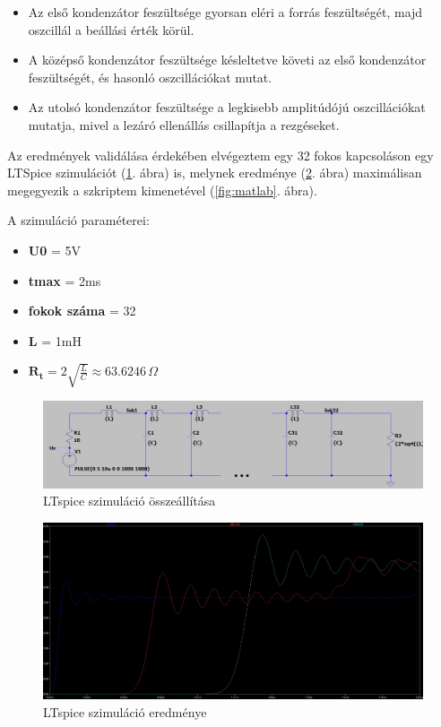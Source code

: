 \documentclass[12pt,a4paper]{article}
\begin{document}
\begin{itemize}
    \item Az első kondenzátor feszültsége gyorsan eléri a forrás feszültségét, majd oszcillál a beállási érték körül.
    \item A középső kondenzátor feszültsége késleltetve követi az első kondenzátor feszültségét, és hasonló oszcillációkat mutat.
    \item Az utolsó kondenzátor feszültsége a legkisebb amplitúdójú oszcillációkat mutatja, mivel a lezáró ellenállás csillapítja a rezgéseket.
\end{itemize}

Az eredmények validálása érdekében elvégeztem egy 32 fokos kapcsoláson egy LTSpice szimulációt (\ref{fig:ltspicesim}. ábra) is, melynek eredménye (\ref{fig:ltspice}. ábra) maximálisan megegyezik a szkriptem kimenetével (\ref{fig:matlab}. ábra).

A szimuláció paraméterei:
\begin{itemize}
    \item \textbf{U0} = 5V
    \item \textbf{tmax} = 2ms
    \item \textbf{fokok száma} = 32
    \item \textbf{L} = 1mH
    \item \( \mathbf{R_t} = 2 \sqrt{\frac{L}{C}} \approx 63.6246 \, \Omega \)
\end{itemize}

\begin{figure}[H]
    \centering
    \includegraphics[width=1\textwidth]{figures/ltspicesim.jpg}
    \caption{LTspice szimuláció összeállítása}
    \label{fig:ltspicesim}
\end{figure}

\pagebreak

\begin{figure}[H]
    \centering
    \includegraphics[width=1\textwidth]{figures/32ltspice.jpg}
    \caption{LTspice szimuláció eredménye}
    \label{fig:ltspice}
\end{figure}
\end{document}
